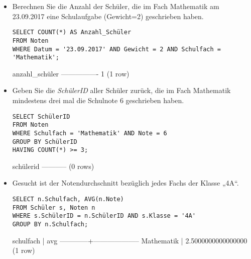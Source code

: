 \documentclass{bschlangaul-aufgabe}
\begin{document}
\begin{enumerate}
\begin{itemize}
%

\item Berechnen Sie die Anzahl der Schüler, die im Fach Mathematik am
23.09.2017 eine Schulaufgabe (\dh Gewicht=2) geschrieben haben.

\begin{bAntwort}
\begin{verbatim}
SELECT COUNT(*) AS Anzahl_Schüler
FROM Noten
WHERE Datum = '23.09.2017' AND Gewicht = 2 AND Schulfach = 'Mathematik';
\end{verbatim}

\begin{bSqlErgebnis}
 anzahl_schüler
----------------
              1
(1 row)
\end{bSqlErgebnis}
\end{bAntwort}

%

\item Geben Sie die \emph{SchülerID} aller Schüler zurück, die im Fach
Mathematik mindestens drei mal die Schulnote $6$ geschrieben haben.

\begin{bAntwort}
\begin{verbatim}
SELECT SchülerID
FROM Noten
WHERE Schulfach = 'Mathematik' AND Note = 6
GROUP BY SchülerID
HAVING COUNT(*) >= 3;
\end{verbatim}

\begin{bSqlErgebnis}
 schülerid
-----------
(0 rows)
\end{bSqlErgebnis}
\end{bAntwort}

%

\item Gesucht ist der Notendurchschnitt bezüglich jedes Fachs der Klasse
„4A“.

\begin{bAntwort}
\begin{verbatim}
SELECT n.Schulfach, AVG(n.Note)
FROM Schüler s, Noten n
WHERE s.SchülerID = n.SchülerID AND s.Klasse = '4A'
GROUP BY n.Schulfach;
\end{verbatim}

\begin{bSqlErgebnis}
schulfach  |        avg
------------+--------------------
 Mathematik | 2.5000000000000000
(1 row)
\end{bSqlErgebnis}
\end{bAntwort}
\end{itemize}


\end{enumerate}
\end{document}
